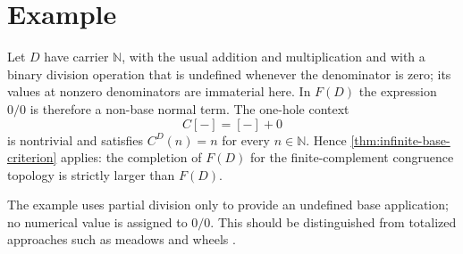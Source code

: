 \section{Example}\label{sec:examples}

\begin{example}
Let $D$ have carrier $\mathbb N$, with the usual addition and multiplication
and with a binary division operation that is undefined whenever the denominator
is zero; its values at nonzero denominators are immaterial here.  In $F(D)$ the
expression $0/0$ is therefore a non-base normal term.  The one-hole context
\[
 C[-]=[-]+0
\]
is nontrivial and satisfies $C^D(n)=n$ for every $n\in\mathbb N$.  Hence
\cref{thm:infinite-base-criterion} applies: the completion of $F(D)$ for the
finite-complement congruence topology is strictly larger than $F(D)$.
\end{example}

The example uses partial division only to provide an undefined base
application; no numerical value is assigned to $0/0$.  This should be
distinguished from totalized approaches such as meadows and wheels
\cite{BergstraHirshfeldTucker2009,Carlstrom2004}.
